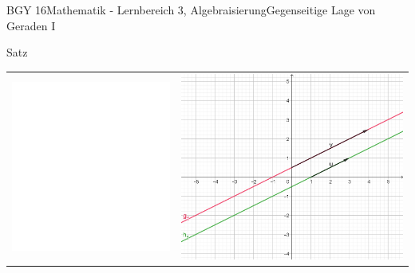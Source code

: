 \documentclass[oneside,openany,headings=optiontotoc,11pt,numbers=noenddot]{scrreprt}
\begin{document}
\begin{worksheet}{BGY 16}{Mathematik - Lernbereich 3, Algebraisierung}{Gegenseitige Lage von Geraden I}
\begin{framed}
		\end{framed}
		\begin{framed}
			\tiny{\color{codegray}Satz}
			\noindent
			\begin{center}
				\begin{tabularx}{\textwidth}{Xr}
					\includegraphics[scale=0.29]{../empty.jpg} & \includegraphics[scale=0.29]{Bilder/ghParallel.jpg}\\

\end{tabularx}
\end{center}
\end{framed}
\end{worksheet}
\end{document}
